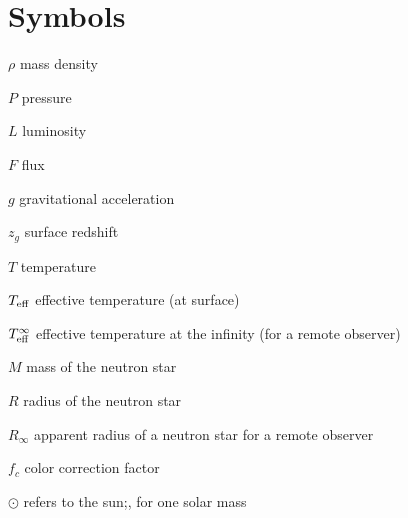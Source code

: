 \clearpage
{}
{}

\chapter*{Symbols}


\begin{symbollist}{\symbsize}

   \item [\hfil$\rho$] mass density

   \item [\hfil$P$] pressure  
   
   \item [\hfil$L$] luminosity   
   
   \item [\hfil$F$] flux   
   
   \item [\hfil$g$] gravitational acceleration   
   
   \item [\hfil$ z_g$] surface redshift

   \item [\hfil$T$] temperature
   
   \item [\hfil$T_{\rm eff}$] effective temperature (at surface)

   \item [\hfil$T_{\rm eff}^{\infty}$] effective temperature at the infinity (for a remote observer)

   \item [\hfil$M$] mass of the neutron star

   \item [\hfil$R$] radius of the neutron star

   \item [\hfil$R_{\infty}$] apparent  radius of a neutron star for a remote observer 

   \item [\hfil$f_c$] color correction factor
   
   \item [\hfil$\odot$] refers to the sun;\eg, \Msol for one solar mass
\end{symbollist}



\vspace{\symbsep}

